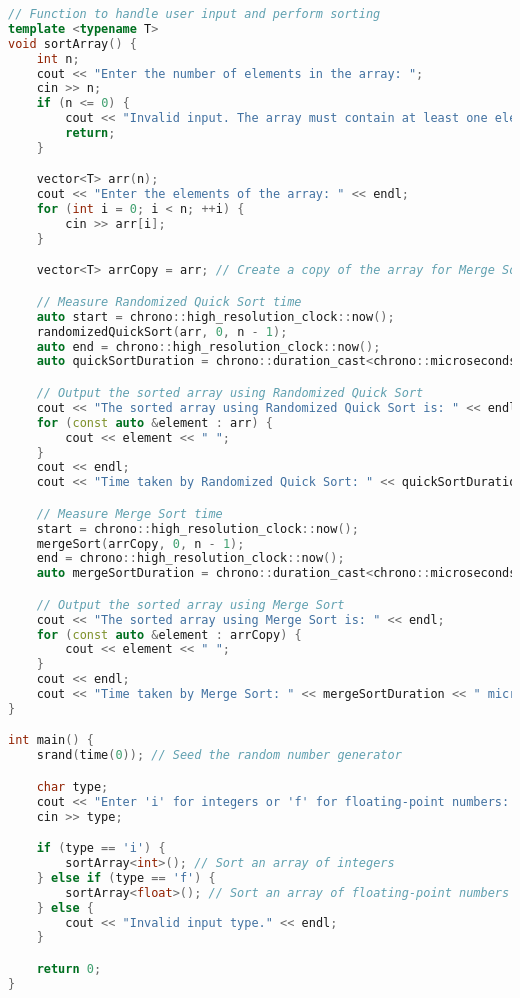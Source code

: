 \documentclass{article}
\begin{document}
\begin{lstlisting}[language=C++]
// Function to handle user input and perform sorting
template <typename T>
void sortArray() {
    int n;
    cout << "Enter the number of elements in the array: ";
    cin >> n;
    if (n <= 0) {
        cout << "Invalid input. The array must contain at least one element." << endl;
        return;
    }

    vector<T> arr(n);
    cout << "Enter the elements of the array: " << endl;
    for (int i = 0; i < n; ++i) {
        cin >> arr[i];
    }

    vector<T> arrCopy = arr; // Create a copy of the array for Merge Sort comparison

    // Measure Randomized Quick Sort time
    auto start = chrono::high_resolution_clock::now();
    randomizedQuickSort(arr, 0, n - 1);
    auto end = chrono::high_resolution_clock::now();
    auto quickSortDuration = chrono::duration_cast<chrono::microseconds>(end - start).count();

    // Output the sorted array using Randomized Quick Sort
    cout << "The sorted array using Randomized Quick Sort is: " << endl;
    for (const auto &element : arr) {
        cout << element << " ";
    }
    cout << endl;
    cout << "Time taken by Randomized Quick Sort: " << quickSortDuration << " microseconds" << endl;

    // Measure Merge Sort time
    start = chrono::high_resolution_clock::now();
    mergeSort(arrCopy, 0, n - 1);
    end = chrono::high_resolution_clock::now();
    auto mergeSortDuration = chrono::duration_cast<chrono::microseconds>(end - start).count();

    // Output the sorted array using Merge Sort
    cout << "The sorted array using Merge Sort is: " << endl;
    for (const auto &element : arrCopy) {
        cout << element << " ";
    }
    cout << endl;
    cout << "Time taken by Merge Sort: " << mergeSortDuration << " microseconds" << endl;
}

int main() {
    srand(time(0)); // Seed the random number generator

    char type;
    cout << "Enter 'i' for integers or 'f' for floating-point numbers: ";
    cin >> type;

    if (type == 'i') {
        sortArray<int>(); // Sort an array of integers
    } else if (type == 'f') {
        sortArray<float>(); // Sort an array of floating-point numbers
    } else {
        cout << "Invalid input type." << endl;
    }

    return 0;
}
\end{lstlisting}
\end{document}
